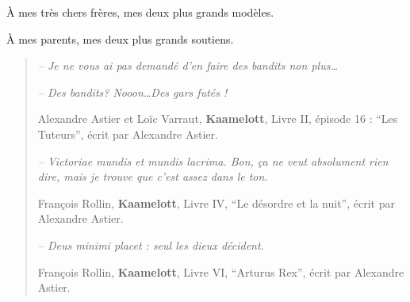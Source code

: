 
\begin{dedication}
    À mes très chers frères, mes deux plus grands modèles.

    À mes parents, mes deux plus grands soutiens.

    \vfill{}

    \begin{small}
    \begin{quote}
        \emph{-- Je ne vous ai pas demandé d'en faire des \emph{bandits} non plus\dots}

        \emph{-- Des \emph{bandits}? Nooon\dots Des gars futés !}

        Alexandre Astier et Loïc Varraut,
        \textbf{Kaamelott}, Livre II, épisode 16 : ``Les Tuteurs'', écrit par Alexandre Astier.

    \hr{}

        \emph{-- Victoriae mundis et mundis lacrima. Bon, ça ne veut absolument rien dire, mais je trouve que c’est assez dans le ton.}

        François Rollin, \textbf{Kaamelott}, Livre IV, ``Le désordre et la nuit'', écrit par Alexandre Astier.

    \hr{}

        \emph{-- Deus minimi placet : seul les dieux décident.}

        François Rollin, \textbf{Kaamelott}, Livre VI, ``Arturus Rex'', écrit par Alexandre Astier.
    \end{quote}
    \end{small}






\end{dedication}
